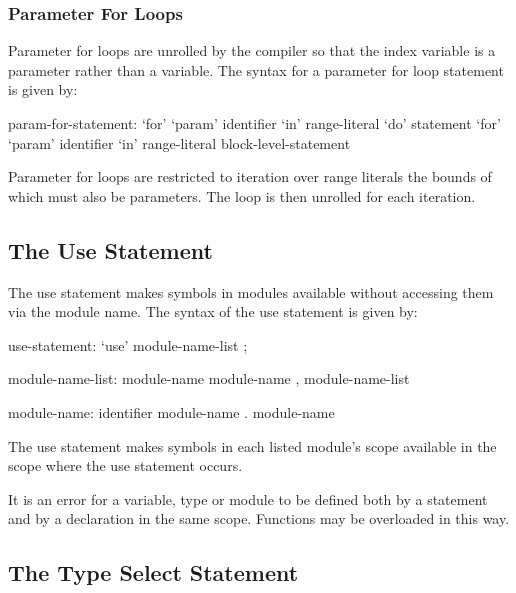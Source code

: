 \subsubsection{Parameter For Loops}
\label{Parameter_For_Loops}


Parameter for loops are unrolled by the compiler so that the index
variable is a parameter rather than a variable.  The syntax for a
parameter for loop statement is given by:
\begin{syntax}
param-for-statement:
  `for' `param' identifier `in' range-literal `do' statement
  `for' `param' identifier `in' range-literal block-level-statement
\end{syntax}
Parameter for loops are restricted to iteration over range literals
the bounds of which must also be parameters.  The loop is then
unrolled for each iteration.

\subsection{The Use Statement}
\label{The_Use_Statement}

The use statement makes symbols in modules available without accessing
them via the module name.  The syntax of the use statement is given
by:
\begin{syntax}
use-statement:
  `use' module-name-list ;

module-name-list:
  module-name
  module-name , module-name-list

module-name:
  identifier
  module-name . module-name
\end{syntax}
The use statement makes symbols in each listed module's scope available
in the scope where the use statement occurs.

It is an error for a variable, type or module to be defined both by a
 statement and by a declaration in the same scope.
Functions may be overloaded in this way.

\subsection{The Type Select Statement}
\label{The_Type_Select_Statement}



